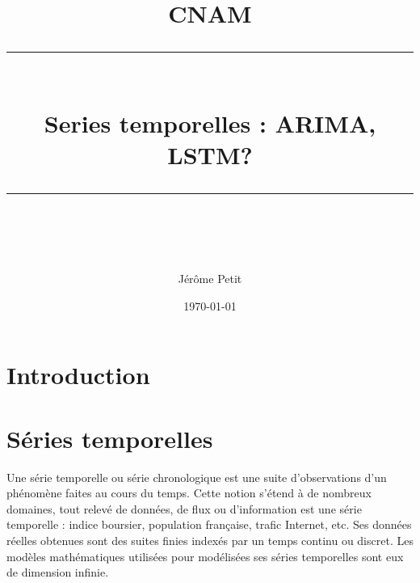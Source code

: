 \documentclass[11pt]{scrartcl} %
\title{	
	\normalfont\normalsize
	\textsc{CNAM}\\ %
	\vspace{25pt} %
	\rule{\linewidth}{0.5pt}\\ %
	\vspace{20pt} %
	{\huge Series temporelles : ARIMA, LSTM?}\\ %
	\vspace{12pt} %
	\rule{\linewidth}{2pt}\\ %
	\vspace{12pt} %
}
\author{\LARGE Jérôme Petit} %
\date{\normalsize\today} %
\begin{document}
\maketitle %

%
\section{Introduction}


\section{Séries temporelles}
Une série temporelle ou série chronologique est une suite d’observations d’un phénomène faites au cours du temps. Cette notion s'étend à de nombreux domaines, tout relevé de données, de flux ou d'information est une série temporelle : indice boursier, population française, trafic Internet, etc. Ses données réelles obtenues sont des suites finies indexés par un temps continu ou discret. Les modèles mathématiques utilisées pour modélisées ses séries temporelles sont eux de dimension infinie.
\end{document}
